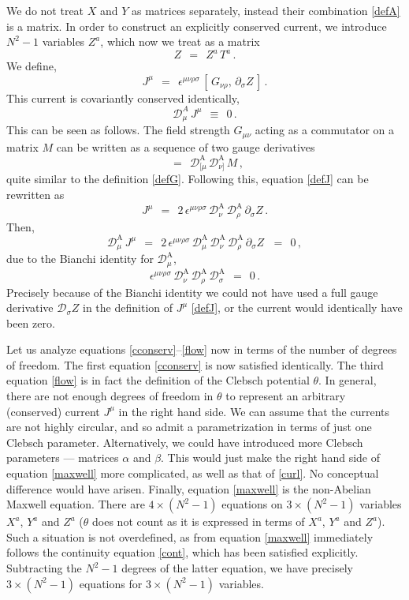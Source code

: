 \documentclass[epsfig,12pt]{article}
\def\beq{\begin{equation}}
\def\eeq{\end{equation}}
\newcommand{\p}{\partial}
\newcommand{\md}{\mathcal{D}}
\begin{document}
        We do not treat $ X $ and $ Y $ as matrices separately, instead their combination \eqref{defA} is a matrix.
	In order to construct an explicitly conserved current, we introduce $ N^2 - 1 $ variables $ Z^a $,
	which now we treat as a matrix
\beq
	Z    ~~=~~    Z^a\, T^a\,.
\eeq
	We define,
\beq
\label{defJ}
	J^\mu    ~~=~~    \epsilon^{\mu\nu\rho\sigma}\, [\, G_{\nu\rho},\, \p_\sigma Z\, ]\,.
\eeq
	This current is covariantly conserved identically,
\beq
\label{cont}
	\md^{A}_\mu\, J^\mu    ~~\equiv~~    0\,.
\eeq
	This can be seen as follows.
	The field strength $ G_{\mu\nu} $ acting as a commutator on a matrix $ M $ can be written as
	a sequence of two gauge derivatives
\beq
	[\, G_{\mu\nu}\,\, M \,]    ~~=~~    \md^\text{A}_{[\mu}\, \md^\text{A}_{\nu]}\, M\,,
\eeq
	quite similar to the definition \eqref{defG}.
	Following this, equation \eqref{defJ} can be rewritten as
\beq
	J^\mu    ~~=~~    2\, \epsilon^{\mu\nu\rho\sigma}\, \md^\text{A}_\nu\, \md^\text{A}_\rho\, \p_\sigma Z\,.
\eeq
	Then,
\beq
	\md^\text{A}_\mu\, J^\mu    ~~=~~    2\, \epsilon^{\mu\nu\rho\sigma}\,
					     \md^\text{A}_\mu\, \md^\text{A}_\nu\, \md^\text{A}_\rho\, \p_\sigma Z\,
				    ~~=~~    0\,,
\eeq
	due to the Bianchi identity for $ \md^\text{A}_\mu $,
\beq
	\epsilon^{\mu\nu\rho\sigma}\, \md^\text{A}_\nu\, \md^\text{A}_\rho\, \md^\text{A}_\sigma    ~~=~~    0\,.
\eeq
	Precisely because of the Bianchi identity we could not have used a full gauge derivative $ \md_\sigma Z $
	in the definition of $ J^\mu $ \eqref{defJ}, or the current would identically have been zero.

	Let us analyze equations \eqref{cconserv}--\eqref{flow} now in terms of the number of degrees of freedom.
	The first equation \eqref{cconserv} is now satisfied identically.
	The third equation \eqref{flow} is in fact the definition of the Clebsch potential $ \theta $.
	In general, there are not enough degrees of freedom in $ \theta $ to represent an arbitrary
	(conserved) current $ J^\mu $ in the right hand side.
	We can assume that the currents are not highly circular, and so admit a parametrization in terms of
	just one Clebsch parameter.
	Alternatively, we could have introduced more Clebsch parameters --- matrices $ \alpha $ and $ \beta $.
	This would just make the right hand side of equation \eqref{maxwell} more complicated, as well as that of \eqref{curl}.
	No conceptual difference would have arisen.
	Finally, equation \eqref{maxwell} is the non-Abelian Maxwell equation.
	There are $ 4 \times (N^2 - 1 ) $ equations on $ 3 \times (N^2 - 1) $ variables
	$ X^a $, $ Y^a $ and $ Z^a $
	($ \theta $ does not count as it is expressed in terms of $ X^a $, $ Y^a $ and $ Z^a $).
	Such a situation is not overdefined, as from equation \eqref{maxwell} immediately follows
	the continuity equation \eqref{cont}, which has been satisfied explicitly.
	Subtracting the $ N^2 - 1 $ degrees of the latter equation, we have precisely
	$ 3 \times (N^2 - 1) $ equations for $ 3 \times (N^2 - 1) $ variables.
\end{document}
